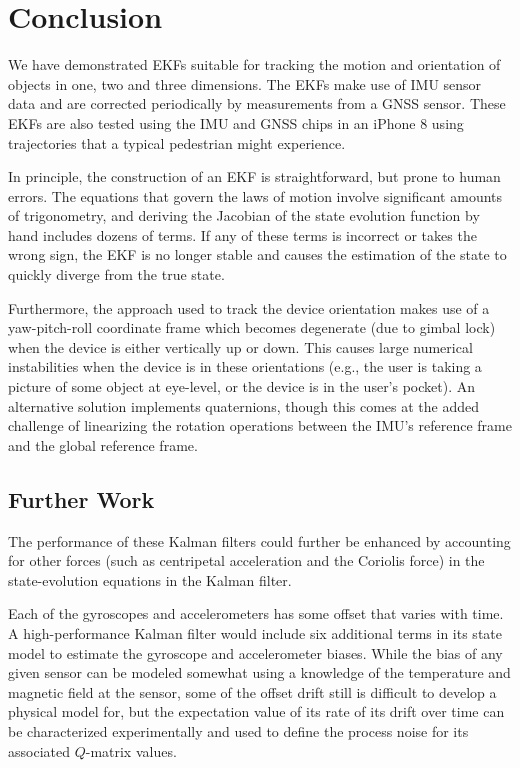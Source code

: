 \documentclass[10pt]{article}
\begin{document}
\section{Conclusion}

We have demonstrated EKFs suitable for tracking the motion and orientation of objects in one, two and three dimensions. The EKFs make use of IMU sensor data and are corrected periodically by measurements from a GNSS sensor. These EKFs are also tested using the IMU and GNSS chips in an iPhone 8 using trajectories that a typical pedestrian might experience.

In principle, the construction of an EKF is straightforward, but prone to human errors. The equations that govern the laws of motion involve significant amounts of trigonometry, and deriving the Jacobian of the state evolution function by hand includes dozens of terms. If any of these terms is incorrect or takes the wrong sign, the EKF is no longer stable and causes the estimation of the state to quickly diverge from the true state. 

Furthermore, the approach used to track the device orientation makes use of a yaw-pitch-roll coordinate frame which becomes degenerate (due to gimbal lock) when the device is either vertically up or down. This causes large numerical instabilities when the device is in these orientations (e.g., the user is taking a picture of some object at eye-level, or the device is in the user's pocket). An alternative solution implements quaternions, though this comes at the added challenge of linearizing the rotation operations between the IMU's reference frame and the global reference frame.

\subsection{Further Work}

The performance of these Kalman filters could further be enhanced by accounting for other forces (such as centripetal acceleration and the Coriolis force) in the state-evolution equations in the Kalman filter.

Each of the gyroscopes and accelerometers has some offset that varies with time. A high-performance Kalman filter would include six additional terms in its state model to estimate the gyroscope and accelerometer biases. While the bias of any given sensor can be modeled somewhat using a knowledge of the temperature and magnetic field at the sensor, some of the offset drift still is difficult to develop a physical model for, but the expectation value of its rate of its drift over time can be characterized experimentally and used to define the process noise for its associated $Q$-matrix values.
\end{document}
